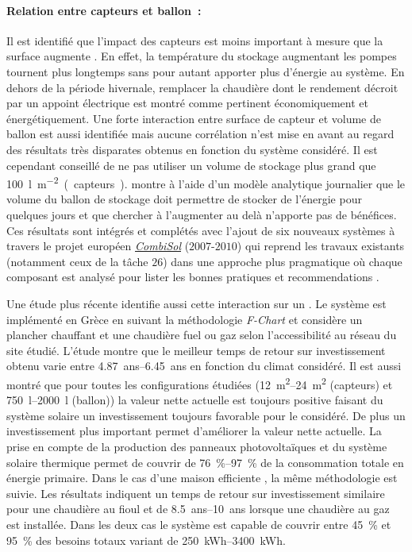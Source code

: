 \paragraph{Relation entre capteurs et ballon~:} %
\label{par:relation_entre_capteurs_et_ballon}
Il est identifié que l’impact des capteurs est moins important à mesure
que la surface augmente \parencite{Task26C2007}. En effet, la température du stockage augmentant les pompes
tournent plus longtemps sans pour autant apporter plus d’énergie au système. En dehors
de la période hivernale, remplacer la chaudière dont le rendement décroit par un appoint
électrique est montré comme pertinent économiquement et énergétiquement.
Une forte interaction entre surface de capteur et volume de ballon est aussi identifiée
mais aucune corrélation n’est mise en avant au regard des résultats très disparates
obtenus en fonction du système considéré. Il est cependant conseillé de ne pas utiliser
un volume de stockage plus grand que \SI{100}{\litre\per\metre\squared (capteurs)}.
\textcite{Lund200559} montre à l’aide d’un modèle analytique journalier que le volume
du ballon de stockage doit permettre de stocker de l’énergie pour quelques jours et que
chercher à l’augmenter au delà n’apporte pas de bénéfices.
Ces résultats sont intégrés et complétés avec l’ajout de six nouveaux systèmes à travers
le projet européen \href{http://www.combisol.eu/}{\textit{CombiSol}} ($2007$-$2010$) qui reprend
les travaux existants (notamment ceux de la tâche $26$) dans une approche plus pragmatique où
chaque composant est analysé pour lister les bonnes pratiques et recommendations \parencite{Thur2011}.

Une étude plus récente \parencite{Tsalikis2015743} identifie aussi cette interaction sur
un . Le système est implémenté en Grèce en suivant la méthodologie
\textit{F-Chart} et considère un plancher chauffant et une chaudière fuel ou gaz selon
l’accessibilité au réseau du site étudié. L’étude montre que le meilleur temps de retour
sur investissement obtenu varie entre \SIrange{4.87}{6.45}{ans} en fonction du climat
considéré. Il est aussi montré que pour toutes les configurations étudiées
(\SIrange{12}{24}{\metre\squared} (capteurs) et \SIrange{750}{2000}{\litre} (ballon))
la valeur nette actuelle est toujours positive faisant du système solaire un
investissement toujours favorable pour le  considéré. De plus un
investissement plus important permet d’améliorer la valeur nette actuelle. La prise en
compte de la production des panneaux photovoltaïques et du système solaire thermique permet
de couvrir de \SIrange{76}{97}{\percent} de la consommation totale en énergie primaire.
Dans le cas d’une maison efficiente \parencite{Martinopoulos2014130}, la même méthodologie
est suivie. Les résultats indiquent un temps de retour sur investissement similaire pour une
chaudière au fioul et de \SIrange{8.5}{10}{ans} lorsque une chaudière au gaz est installée.
Dans les deux cas le système est capable de couvrir entre \SI{45}{\percent} et
\SI{95}{\percent} des besoins totaux variant de \SIrange{250}{3400}{kWh}.

